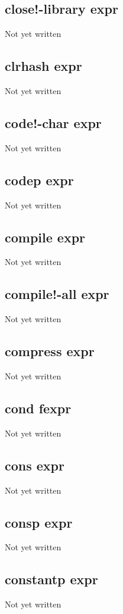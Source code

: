 \documentclass[a4paper,11pt]{article}
\begin{document}
{\subsection{\ttfamily close!-library expr}
   Not yet written

\subsection{\ttfamily clrhash expr}
   Not yet written

\subsection{\ttfamily code!-char expr}
   Not yet written

\subsection{\ttfamily codep expr}
   Not yet written

\subsection{\ttfamily compile expr}
   Not yet written

\subsection{\ttfamily compile!-all expr}
   Not yet written

\subsection{\ttfamily compress expr}
   Not yet written

\subsection{\ttfamily cond fexpr}
   Not yet written

\subsection{\ttfamily cons expr}
   Not yet written

\subsection{\ttfamily consp expr}
   Not yet written

\subsection{\ttfamily constantp expr}
   Not yet written

}
\end{document}

